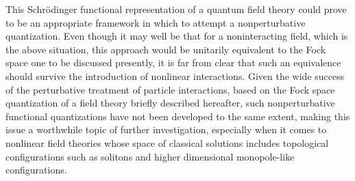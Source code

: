 \documentclass[a4paper,11pt]{article}
\begin{document}
This Schr\"odinger functional representation of a quantum field
theory could prove to be an appropriate framework in which to attempt 
a nonperturbative quantization. Even though it may well be that for a
noninteracting field, which is the above situation, this approach
would be unitarily equivalent to the Fock space one to
be discussed presently, it is far from clear that such an equivalence
should survive the introduction of nonlinear interactions. Given the
wide success of the perturbative treatment of particle interactions,
based on the Fock space quantization of a field theory briefly described
hereafter, such nonperturbative functional quantizations have not been
developed to the same extent, making this issue a worthwhile topic of 
further investigation,\cite{CCR} especially when it comes to nonlinear
field theories whose space of classical solutions includes topological
configurations such as solitons and higher dimensional monopole-like
configurations.
\end{document}
